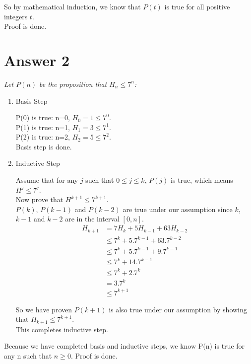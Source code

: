 \documentclass[12pt]{article}
\begin{document}
So by mathematical induction, we know that $P(t)$ is true for all positive integers $t$.\\Proof is done.

\section*{Answer 2}

\textit{Let $P(n)$ be the proposition that $H_n\leq 7^n$:}

\begin{enumerate}

\item Basis Step

P(0) is true: n=0, $H_0=1\leq 7^0$.\\ 
P(1) is true: n=1, $H_1=3\leq 7^1$.\\
P(2) is true: n=2, $H_2=5\leq 7^2$.\\
Basis step is done.

\item Inductive Step

Assume that for any $j$ such that $0\leq j\leq k$, $P(j)$ is true, which means $H^j\leq 7^j$.\\
Now prove that $H^{k+1}\leq 7^{k+1}$.\\
$P(k)$, $P(k-1)$ and $P(k-2)$ are true under our  assumption since $k$, $k-1$ and $k-2$ are in the interval $\left[0,n\right]$.
\begin{equation*}
\begin{split}
	H_{k+1} & = 7H_k+5H_{k-1}+63H_{k-2}\\
			& \leq 7^k + 5.7^{k-1} + 63.7^{k-2}\\
			& \leq 7^k + 5.7^{k-1} + 9.7^{k-1}\\
			& \leq 7^k +14.7^{k-1}\\
			& \leq 7^k + 2.7^k\\
			& = 3.7^k\\
			& \leq 7^{k+1}
\end{split}
\end{equation*}

So we have proven $P(k+1)$ is also true under our assumption by showing that $H_{k+1}\leq 7^{k+1}$.\\
This completes inductive step.

\end{enumerate}

Because we have completed basis and inductive steps, we know P(n) is true for any n such that $n\geq 0$.
Proof is done.
\end{document}
